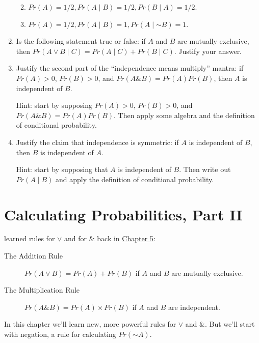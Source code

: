 \documentclass[justified]{tufte-book}
\providecommand{\tightlist}{%
  \setlength{\itemsep}{0pt}\setlength{\parskip}{0pt}}
\newcommand{\given}{\mid}
\renewcommand{\neg}{\mathbin{\sim}}
\renewcommand{\wedge}{\mathbin{\&}}
\newcommand{\p}{Pr}
\theoremstyle{definition}
\theoremstyle{definition}
\theoremstyle{definition}
\theoremstyle{remark}
\begin{document}
\begin{enumerate}
  \begin{enumerate}
  \def\labelenumii{\alph{enumii}.}
  \tightlist
  \item
    \(\p(A) = 1/2, \p(A \given B) = 1/2, \p(B \given A) = 1/2\).
  \item
    \(\p(A) = 1/2, \p(A \given B) = 1, \p(A \given \neg B) = 1\).
  \end{enumerate}
\item
  Is the following statement true or false: if \(A\) and \(B\) are
  mutually exclusive, then
  \(Pr(A \vee B \given C) = Pr(A \given C) + Pr(B \given C)\). Justify
  your answer.
\item
  Justify the second part of the ``independence means multiply'' mantra:
  if \(\p(A) > 0\), \(\p(B) > 0\), and \(\p(A \wedge B) = \p(A) \p(B)\),
  then \(A\) is independent of \(B\).

  Hint: start by supposing \(\p(A) > 0\), \(\p(B) > 0\), and
  \(\p(A \wedge B) = \p(A)\p(B)\). Then apply some algebra and the
  definition of conditional probability.
\item
  Justify the claim that independence is symmetric: if \(A\) is
  independent of \(B\), then \(B\) is independent of \(A\).

  Hint: start by supposing that \(A\) is independent of \(B\). Then
  write out \(\p(A \given B)\) and apply the definition of conditional
  probability.
\end{enumerate}

\hypertarget{calculating-probabilities-part-ii}{%
\chapter{Calculating Probabilities, Part
II}\label{calculating-probabilities-part-ii}}

 learned rules for \(\vee\) and for \(\wedge\) back in
\protect\hyperlink{calculating-probabilities}{Chapter 5}:

\begin{description}
\item[The Addition Rule]
\(\p(A \vee B) = \p(A) + \p(B)\) if \(A\) and \(B\) are mutually
exclusive.
\item[The Multiplication Rule]
\(\p(A \& B) = \p(A) \times \p(B)\) if \(A\) and \(B\) are independent.
\end{description}

In this chapter we'll learn new, more powerful rules for \(\vee\) and
\(\wedge\). But we'll start with negation, a rule for calculating
\(\p(\neg A)\).
\end{document}
